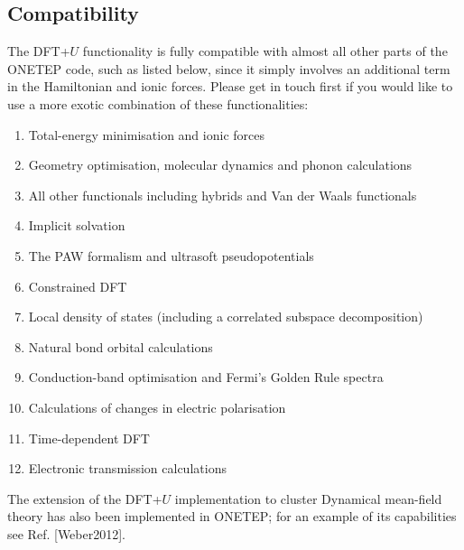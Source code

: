 \documentclass[letterpaper,10pt,english]{sphinxmanual}
\begin{document}
\subsection{Compatibility}
\label{\detokenize{ONETEP_DFT+U_README:compatibility}}
The DFT+\(U\) functionality is fully compatible with almost all
other parts of the ONETEP code, such as listed below, since it simply
involves an additional term in the Hamiltonian and ionic forces. Please
get in touch first if you would like to use a more exotic combination of
these functionalities:
\begin{enumerate}
\item {} 
Total-energy minimisation and ionic forces

\item {} 
Geometry optimisation, molecular dynamics and phonon calculations

\item {} 
All other functionals including hybrids and Van der Waals functionals

\item {} 
Implicit solvation

\item {} 
The PAW formalism and ultrasoft pseudopotentials

\item {} 
Constrained DFT

\item {} 
Local density of states (including a correlated subspace
decomposition)

\item {} 
Natural bond orbital calculations

\item {} 
Conduction-band optimisation and Fermi’s Golden Rule spectra

\item {} 
Calculations of changes in electric polarisation

\item {} 
Time-dependent DFT

\item {} 
Electronic transmission calculations

\end{enumerate}

The extension of the DFT+\(U\) implementation to cluster Dynamical
mean-field theory has also been implemented in ONETEP; for an example of
its capabilities see Ref. {[}Weber2012{]}.
\end{document}
